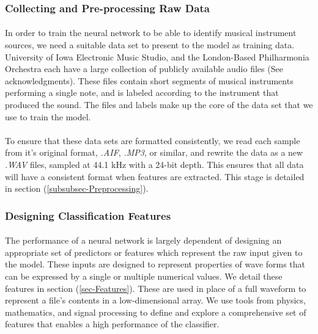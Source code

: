 \documentclass[12pt,letterpaper]{article}
\begin{document}
\subsubsection{Collecting and Pre-processing Raw Data}

\paragraph*{}In order to train the neural network to be able to identify musical instrument sources, we need a suitable data set to present to the model as training data. University of Iowa Electronic Music Studio, and the London-Based Philharmonia Orchestra each have a large collection of publicly available audio files (See acknowledgments). These files contain short segments of musical instruments performing a single note, and is labeled according to the instrument that produced the sound. The files and labels make up the core of the data set that we use to train the model.

\paragraph*{}To ensure that these data sets are formatted consistently, we read each sample from it's original format, \textit{.AIF}, \textit{.MP3}, or similar, and rewrite the data as a new \textit{.WAV} files, sampled at 44.1 kHz with a 24-bit depth. This ensures that all data will have a consistent format when features are extracted. This stage is detailed in section (\ref{subsubsec-Preprocessing}).


\subsubsection{Designing Classification Features}

\paragraph*{}The performance of a neural network is largely dependent of designing an appropriate set of predictors or features which represent the raw input given to the model. These inputs are designed to represent properties of wave forms that can be expressed by a single or multiple numerical values. We detail these features in section (\ref{sec-Features}). These are used in place of a full waveform to represent a file's contents in a low-dimensional array. We use tools from physics, mathematics, and signal processing to define and explore a comprehensive set of features that enables a high performance of the classifier. 
\end{document}
